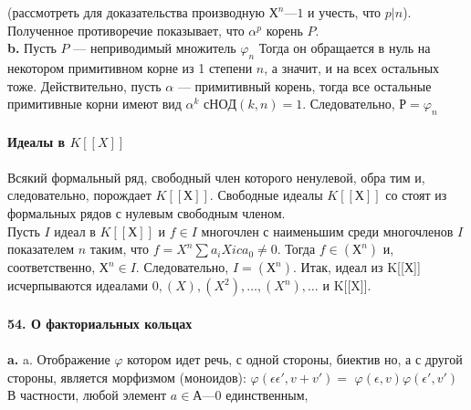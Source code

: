 \noindent (рассмотреть для доказательства производную $Х^{n} — 1$ и учесть, \linebreak
что $p|n$). Полученное противоречие показывает, что $\alpha^{p}$ корень $P$.\\
\hspace*{15pt}\textbf{b.} Пусть $P$ — неприводимый множитель $\varphi_n$ Тогда он обращается\linebreak
в нуль на некотором примитивном корне из 1 степени $n$, а значит, и на\linebreak
всех остальных тоже. Действительно, пусть $\alpha$ — примитивный корень,\linebreak
тогда все остальные примитивные корни имеют вид $\alpha^{k}$ $с НОД(k, n) = 1$.\linebreak
Следовательно, $Р = \varphi_n$\\
\\
\noindent\textbf{Идеалы в $K[[X]]$}\\
\\
\hspace*{15pt} Всякий формальный ряд, свободный член которого ненулевой, обра­\linebreak
тим и, следовательно, порождает $K[[Х]]$. Свободные идеалы $K[[Х]]$ со­\linebreak
стоят из формальных рядов с нулевым свободным членом.\\
\hspace*{0pt} Пусть $I$ идеал в $K[[Х]]$ и $f \in I$ многочлен с наименьшим среди\linebreak
многочленов $I$ показателем $n$ таким, что $f = X^{n}\sum a_{i}X{i} c a_0 \neq 0$. Тогда\linebreak
$f \in (Х^{n})$ и, соответственно, $Х^{n} \in I$. Следовательно, $I = (Х^{n}).$ Итак,\linebreak
идеал из K[[Х]] исчерпываются идеалами ${0}, (X), (X^{2}),\ldots, (X^{n} ), \ldots$ и\linebreak
K[[X]].\\
\\
\noindent\textbf{54. О факториальных кольцах}\\
\\
\hspace*{15pt}\textbf{a.} a. Отображение $\varphi$ котором идет речь, с одной стороны, биектив­\linebreak
но, а с другой стороны, является морфизмом (моноидов): $\varphi(\epsilon\epsilon',v + v') =$\linebreak
$\varphi(\epsilon,v)\varphi(\epsilon', v')$ В частности, любой элемент $a \in А — {0}$ единственным,\linebreak
